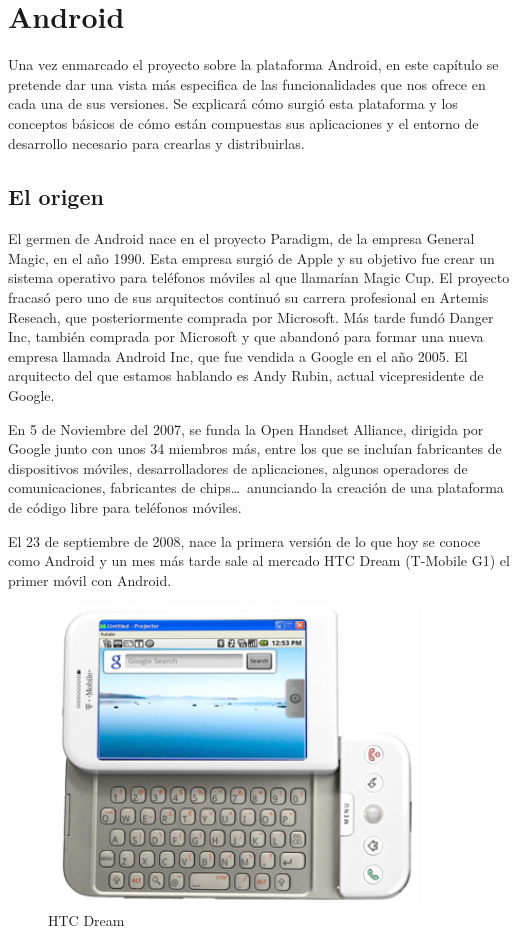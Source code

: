  \chapter{Android}

Una vez enmarcado el proyecto sobre la plataforma Android, en este capítulo se pretende dar una vista más especifica de las funcionalidades que nos ofrece en cada una de sus versiones. Se explicará cómo surgió esta plataforma y los conceptos básicos de cómo están compuestas sus  aplicaciones y el entorno de desarrollo necesario para crearlas y distribuirlas.
\newpage

\section{El origen}

El germen de Android nace en el proyecto Paradigm, de la empresa General Magic, en el año 1990. Esta empresa surgió de Apple y su objetivo fue crear un sistema operativo para teléfonos móviles al que llamarían Magic Cup. El proyecto fracasó pero uno de sus arquitectos continuó su carrera profesional en Artemis Reseach, que posteriormente comprada por Microsoft. Más tarde fundó Danger Inc, también comprada por Microsoft y que abandonó para formar una  nueva empresa llamada Android Inc, que fue vendida a Google en el año 2005. El arquitecto del que estamos hablando es Andy Rubin, actual vicepresidente de Google. 
\newline

En 5 de Noviembre del 2007, se funda la Open Handset Alliance, dirigida por Google junto con unos 34 miembros más, entre los que se incluían fabricantes de dispositivos móviles, desarrolladores de aplicaciones, algunos operadores de comunicaciones, fabricantes de chips\ldots\ anunciando la creación de una plataforma de código libre para teléfonos móviles. 
\newline

El 23 de septiembre de 2008, nace la primera versión de lo que hoy se conoce como Android y un mes más tarde sale al mercado HTC Dream (T-Mobile G1) el primer móvil con Android. 

\begin{figure}[ht]
\centering
\includegraphics[height=8cm]{imagenes/capitulo2/htc-dream.jpg}
\caption{HTC Dream}
\end{figure} 


